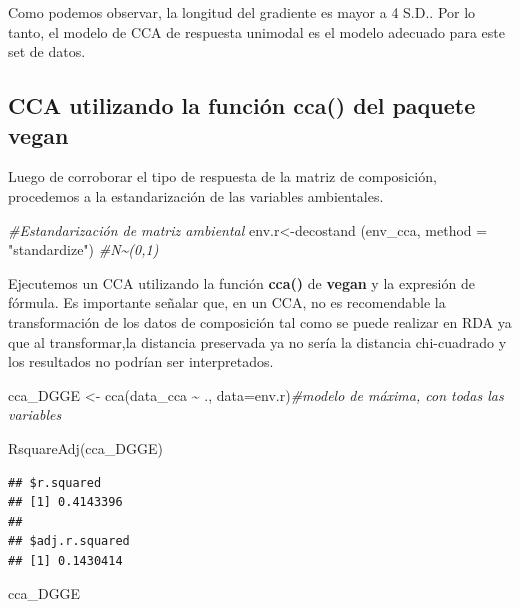 \documentclass[
]{book}
\newenvironment{Shaded}{\begin{snugshade}}{\end{snugshade}}
\newcommand{\AttributeTok}[1]{\textcolor[rgb]{0.77,0.63,0.00}{#1}}
\newcommand{\CommentTok}[1]{\textcolor[rgb]{0.56,0.35,0.01}{\textit{#1}}}
\newcommand{\FunctionTok}[1]{\textcolor[rgb]{0.00,0.00,0.00}{#1}}
\newcommand{\NormalTok}[1]{#1}
\newcommand{\OtherTok}[1]{\textcolor[rgb]{0.56,0.35,0.01}{#1}}
\newcommand{\SpecialCharTok}[1]{\textcolor[rgb]{0.00,0.00,0.00}{#1}}
\newcommand{\StringTok}[1]{\textcolor[rgb]{0.31,0.60,0.02}{#1}}
\begin{document}
Como podemos observar, la longitud del gradiente es mayor a 4 S.D.. Por lo tanto, el modelo de CCA de respuesta unimodal es el modelo adecuado para este set de datos.

\hypertarget{cca-utilizando-la-funciuxf3n-cca-del-paquete-vegan}{%
\subsection{\texorpdfstring{CCA utilizando la función \textbf{cca()} del paquete \textbf{vegan}}{CCA utilizando la función cca() del paquete vegan}}\label{cca-utilizando-la-funciuxf3n-cca-del-paquete-vegan}}

Luego de corroborar el tipo de respuesta de la matriz de composición, procedemos a la estandarización de las variables ambientales.

\begin{Shaded}
\begin{Highlighting}[]
\CommentTok{\#Estandarización de matriz ambiental}
\NormalTok{env.r}\OtherTok{\textless{}{-}}\FunctionTok{decostand}\NormalTok{ (env\_cca, }\AttributeTok{method =} \StringTok{"standardize"}\NormalTok{) }\CommentTok{\#N\textasciitilde{}(0,1)}
\end{Highlighting}
\end{Shaded}

Ejecutemos un CCA utilizando la función \textbf{cca()} de \textbf{vegan} y la expresión de fórmula. Es importante señalar que, en un CCA, no es recomendable la transformación de los datos de composición tal como se puede realizar en RDA ya que al transformar,la distancia preservada ya no sería la distancia chi-cuadrado y los resultados no podrían ser interpretados.

\begin{Shaded}
\begin{Highlighting}[]
\NormalTok{cca\_DGGE }\OtherTok{\textless{}{-}} \FunctionTok{cca}\NormalTok{(data\_cca }\SpecialCharTok{\textasciitilde{}}\NormalTok{ ., }\AttributeTok{data=}\NormalTok{env.r)}\CommentTok{\#modelo de máxima, con todas las variables}

\FunctionTok{RsquareAdj}\NormalTok{(cca\_DGGE) }
\end{Highlighting}
\end{Shaded}

\begin{verbatim}
## $r.squared
## [1] 0.4143396
## 
## $adj.r.squared
## [1] 0.1430414
\end{verbatim}

\begin{Shaded}
\begin{Highlighting}[]
\NormalTok{cca\_DGGE}
\end{Highlighting}
\end{Shaded}
\end{document}

